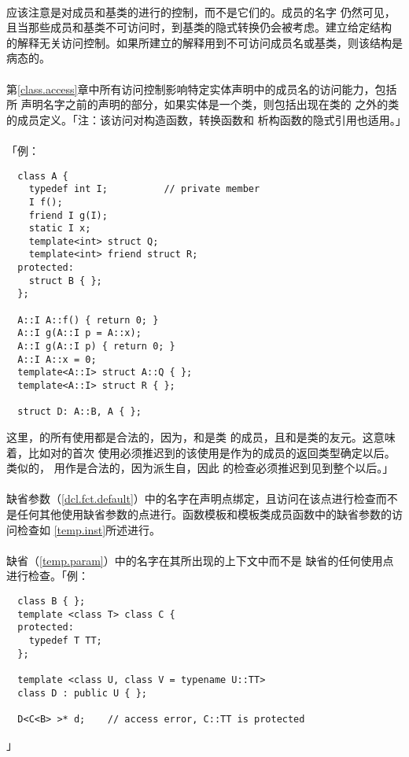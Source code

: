 \paragraph{}
应该注意是对成员和基类的进行的控制，而不是它们的。成员的名字
仍然可见，且当那些成员和基类不可访问时，到基类的隐式转换仍会被考虑。建立给定结构
的解释无关访问控制。如果所建立的解释用到不可访问成员名或基类，则该结构是病态的。

\paragraph{}
第\ref{class.access}章中所有访问控制影响特定实体声明中的成员名的访问能力，包括所
声明名字之前的声明的部分，如果实体是一个类，则包括出现在类的
之外的类的成员定义。「注：该访问对构造函数，转换函数和
析构函数的隐式引用也适用。」

\paragraph{}
「例：
\begin{lstlisting}
  class A {
    typedef int I;          // private member
    I f();
    friend I g(I);
    static I x;
    template<int> struct Q;
    template<int> friend struct R;
  protected:
    struct B { };
  };

  A::I A::f() { return 0; }
  A::I g(A::I p = A::x);
  A::I g(A::I p) { return 0; }
  A::I A::x = 0;
  template<A::I> struct A::Q { };
  template<A::I> struct R { };

  struct D: A::B, A { };
\end{lstlisting}
这里，的所有使用都是合法的，因为，和是类
的成员，且和是类的友元。这意味着，比如对的首次
使用必须推迟到的该使用是作为的成员的返回类型确定以后。类似的，
用作是合法的，因为派生自，因此
的检查必须推迟到见到整个以后。」

\paragraph{}
缺省参数（\ref{dcl.fct.default}）中的名字在声明点绑定，且访问在该点进行检查而不
是任何其他使用缺省参数的点进行。函数模板和模板类成员函数中的缺省参数的访问检查如
\ref{temp.inst}所述进行。

\paragraph{}
缺省（\ref{temp.param}）中的名字在其所出现的上下文中而不是
缺省的任何使用点进行检查。「例：
\begin{lstlisting}
  class B { };
  template <class T> class C {
  protected:
    typedef T TT;
  };

  template <class U, class V = typename U::TT>
  class D : public U { };

  D<C<B> >* d;    // access error, C::TT is protected
\end{lstlisting}」

